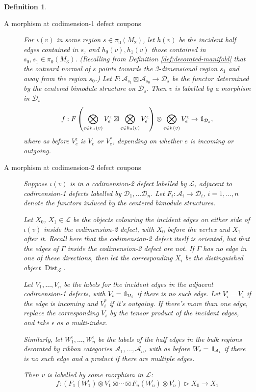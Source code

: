 \documentclass[a4paper]{article}
\numberwithin{equation}{section}
\newtheorem{definition}[counter]{Definition}
\newcommand{\idty}{{\mathrm{1}\mkern-4mu{\mathchoice{}{}{\mskip-0.5mu}{\mskip-1mu}}\mathrm{l}}}
\newcommand{\1}{{\mathrm{1}\mkern-4mu{\mathchoice{}{}{\mskip-0.5mu}{\mskip-1mu}}\mathrm{l}}}
\DeclareMathOperator{\Dist}{Dist}
\newcommand{\A}{\mathcal{A}}
\newcommand{\D}{\mathcal{D}}
\renewcommand{\L}{\mathcal{L}}
\begin{document}
\begin{definition}
\begin{description}
    \item[A morphism at codimension-1 defect coupons]
      For $\iota(v)$ in some region  $s \in \pi_0(M_2)$, let $h(v)$ be the incident half edges contained in $s$, and $h_{0}(v),h_{1}(v)$ those contained in $s_0,s_1 \in \pi_0(M_3)$. (Recalling from Definition \ref{def:decorated-manifold} that the outward normal of $s$ points towards the 3-dimensional region $s_1$ and away from the region $s_0$.) 
      Let $F : \A_{s_1}\boxtimes \A_{s_0} \to \D_s$ be the functor determined by the centered bimodule structure on $\D_s$.
      Then $v$ is labelled by a morphism in $\D_s$
  \begin{equation}
    f : F\left(\bigotimes_{e \in h_{1}(v)} V_e^\epsilon \boxtimes \bigotimes_{e \in h_{0}(v)} V_e^\epsilon \right) \otimes \bigotimes_{e \in h(v)} V_e^\epsilon \to \idty_{\D_s},
  \end{equation}
  where as before $V_e^\epsilon$ is $V_e$ or $V_e^*$, depending on whether $e$ is incoming or outgoing.


\item[A morphism at codimension-2 defect coupons]
      Suppose $\iota(v)$ is in a codimension-2 defect labelled by $\L$, adjacent to codimension-1 defects labelled by $\D_1,
      \ldots \D_n$. Let $F_i : \A_i \to \D_i$, $i = 1,\ldots,n$ denote the functors induced by the centered bimodule structures.

      Let $X_{0}$, $X_{1} \in \L$ be the objects colouring the incident edges on either side of $\iota(v)$ inside the codimension-2 defect, with $X_0$ before the vertex and $X_1$ after it.
      Recall here that the codimension-2 defect itself is oriented, but that the edges of $\Gamma$ inside the codimension-2 defect are not.
      If $\Gamma$ has no edge in one of these directions, then let the corresponding $X_i$ be the distinguished object $\Dist_\L$. 

      Let $V_1,\ldots,V_n$ be the labels for the incident edges in the adjacent codimension-1 defects, with $V_i = \idty_{\D_{i}}$ if there is no such edge.
      Let $V_i^\epsilon = V_i$ if the edge is incoming and $V_i^*$ if it's outgoing.
    If there's more than one edge, replace the corresponding $V_i$ by the tensor product of the incident edges, and take $\epsilon$ as a multi-index.

    Similarly, let $W_1^\epsilon,\ldots,W_n^\epsilon$ be the labels of the half edges in the bulk regions decorated by ribbon categories $\A_1,\ldots, \A_n$, with as before $W_i = \idty_{\A_i}$ if there is no such edge and a product if there are multiple edges. 

      Then $v$ is labelled by some morphism in $\L$:
      \begin{equation}\label{eq:line-coupon}
        f : (F_1(W_1^\epsilon)\otimes V_1^\epsilon\boxtimes\cdots\boxtimes F_n(W_n^\epsilon)\otimes V_n^\epsilon) \triangleright X_0\longrightarrow X_1
      \end{equation}
  \end{description}
\end{definition}
\end{document}
